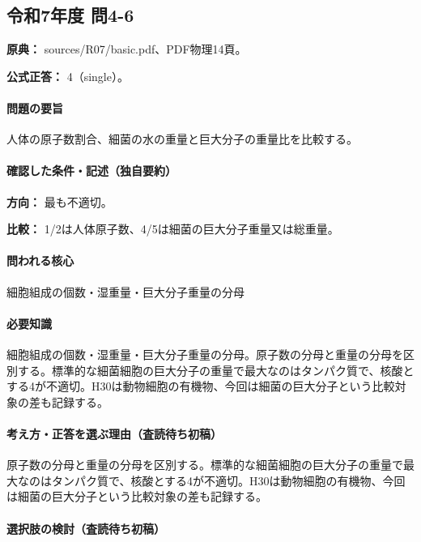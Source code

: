 \subsection{令和7年度 問4-6}
\label{q:r07-reg-basic-4-6}

\noindent\textbf{原典：} sources/R07/basic.pdf、PDF物理14頁。

\textbf{公式正答：} 4（single）。

\paragraph{問題の要旨} 人体の原子数割合、細菌の水の重量と巨大分子の重量比を比較する。

\paragraph{確認した条件・記述（独自要約）}\mbox{}\par

\noindent\textbf{方向：} 最も不適切。\par

\noindent\textbf{比較：} 1/2は人体原子数、4/5は細菌の巨大分子重量又は総重量。\par

\paragraph{問われる核心} 細胞組成の個数・湿重量・巨大分子重量の分母

\paragraph{必要知識} 細胞組成の個数・湿重量・巨大分子重量の分母。原子数の分母と重量の分母を区別する。標準的な細菌細胞の巨大分子の重量で最大なのはタンパク質で、核酸とする4が不適切。H30は動物細胞の有機物、今回は細菌の巨大分子という比較対象の差も記録する。

\paragraph{考え方・正答を選ぶ理由（査読待ち初稿）} 原子数の分母と重量の分母を区別する。標準的な細菌細胞の巨大分子の重量で最大なのはタンパク質で、核酸とする4が不適切。H30は動物細胞の有機物、今回は細菌の巨大分子という比較対象の差も記録する。

\paragraph{選択肢の検討（査読待ち初稿）}\mbox{}\par

